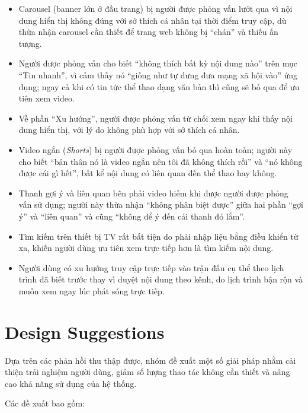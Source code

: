 \documentclass[a4paper,12pt]{article}
\begin{document}
\begin{itemize}
    \item Carousel (banner lớn ở đầu trang) bị người được phỏng vấn lướt qua vì nội dung hiển thị không đúng với sở thích cá nhân tại thời điểm truy cập, dù thừa nhận carousel cần thiết để trang web không bị ``chán'' và thiếu ấn tượng.
    
    \item Người được phỏng vấn cho biết ``không thích bất kỳ nội dung nào'' trên mục ``Tin nhanh'', vì cảm thấy nó ``giống như tự dưng đưa mạng xã hội vào'' ứng dụng; ngay cả khi có tin tức thể thao dạng văn bản thì cũng sẽ bỏ qua để ưu tiên xem video.
    
    \item Về phần ``Xu hướng'', người được phỏng vấn từ chối xem ngay khi thấy nội dung hiển thị, với lý do không phù hợp với sở thích cá nhân.
    
    \item Video ngắn (\textit{Shorts}) bị người được phỏng vấn bỏ qua hoàn toàn; người này cho biết ``bản thân nó là video ngắn nên tôi đã không thích rồi'' và ``nó không được cái gì hết'', bất kể nội dung có liên quan đến thể thao hay không.
    
    \item Thanh gợi ý và liên quan bên phải video hiếm khi được người được phỏng vấn sử dụng; người này thừa nhận ``không phân biệt được'' giữa hai phần ``gợi ý'' và ``liên quan'' và cũng ``không để ý đến cái thanh đó lắm''.
    
    \item Tìm kiếm trên thiết bị TV rất bất tiện do phải nhập liệu bằng điều khiển từ xa, khiến người dùng ưu tiên xem trực tiếp hơn là tìm kiếm nội dung.
    
    \item Người dùng có xu hướng truy cập trực tiếp vào trận đấu cụ thể theo lịch trình đã biết trước thay vì duyệt nội dung theo kênh, do lịch trình bận rộn và muốn xem ngay lúc phát sóng trực tiếp.
\end{itemize}

\section{Design Suggestions}

Dựa trên các phản hồi thu thập được, nhóm đề xuất một số giải pháp nhằm cải thiện trải nghiệm người dùng, giảm số lượng thao tác không cần thiết và nâng cao khả năng sử dụng của hệ thống.

Các đề xuất bao gồm:
\end{document}
